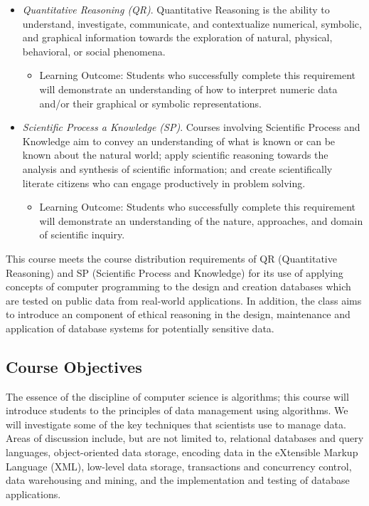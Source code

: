 \documentclass[11pt]{article} %
\begin{document}
\begin{itemize}
	\item \emph{Quantitative Reasoning (QR)}. Quantitative Reasoning is the ability to understand, investigate, communicate, and contextualize numerical, symbolic, and graphical information towards the exploration of natural, physical, behavioral, or social phenomena.

	\begin{itemize}
		\item Learning Outcome: Students who successfully complete this requirement will demonstrate an understanding of how to interpret numeric data and/or their graphical or symbolic representations.
	\end{itemize}


	\item \emph{Scientific Process a Knowledge (SP)}. Courses involving Scientific Process and Knowledge aim to convey an understanding of what is known or can be known about the natural world; apply scientific reasoning towards the analysis and synthesis of scientific information; and create scientifically literate citizens who can engage productively in problem solving.
	
	\begin{itemize}
		\item Learning Outcome: Students who successfully complete this requirement will demonstrate an understanding of the nature, approaches, and domain of scientific inquiry.
	\end{itemize}
\end{itemize}


This course meets the course distribution requirements of QR (Quantitative Reasoning) and SP (Scientific Process and Knowledge) for its use of applying concepts of computer programming to the design and creation databases which are tested on public data from real-world applications. In addition, the class aims to introduce an component of ethical reasoning in the design, maintenance and application of database systems for potentially sensitive data.

\subsection*{Course Objectives}

The essence of the discipline of computer science is algorithms; this course will introduce students to the principles of data management using algorithms.  We will investigate some of the key techniques that scientists use to manage data. Areas of discussion include, but are not limited to, relational databases and query languages, object-oriented data storage, encoding data in the eXtensible Markup Language (XML), low-level data storage, transactions and concurrency control, data warehousing and mining, and the implementation and testing of database applications.  \\
\end{document}
